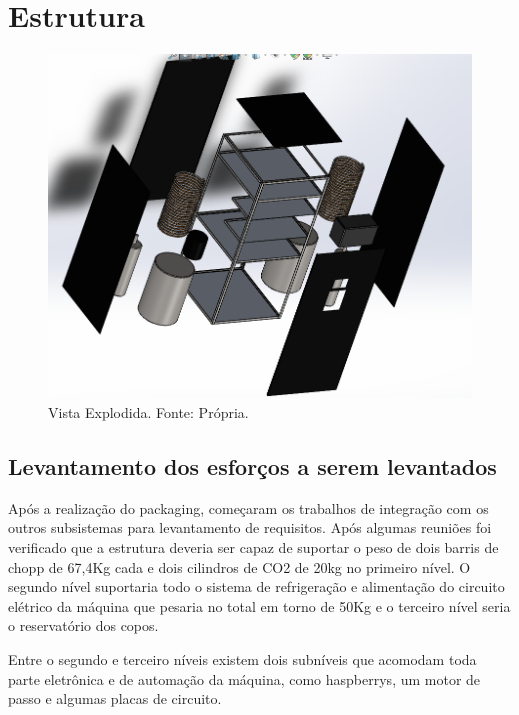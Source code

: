 \chapter[Estrutura]{Estrutura}

  \begin{figure}[H]
    \centering
    \includegraphics[scale= 0.4]{figuras/estrutura/Vista-explodida.png}
    \caption{Vista Explodida. Fonte: Própria.}
    \label{modelagem}
  \end{figure}

  \section[Levantamento dos esforços a serem levantados]{Levantamento dos esforços a serem levantados}

  Após a realização do packaging, começaram os trabalhos de integração com os outros subsistemas para 
  levantamento de requisitos. Após algumas reuniões foi verificado que a estrutura deveria ser capaz 
  de suportar o peso de dois barris de chopp de 67,4Kg cada e dois cilindros de CO2 de 20kg 
  no primeiro nível. O segundo nível suportaria todo o sistema de refrigeração e alimentação 
  do circuito elétrico da máquina que pesaria no total em torno de 50Kg e o terceiro nível 
  seria o reservatório dos copos.

  Entre o segundo e terceiro níveis existem dois subníveis que acomodam toda parte eletrônica e 
  de automação da máquina, como haspberrys, um motor de passo e algumas placas de circuito. 

